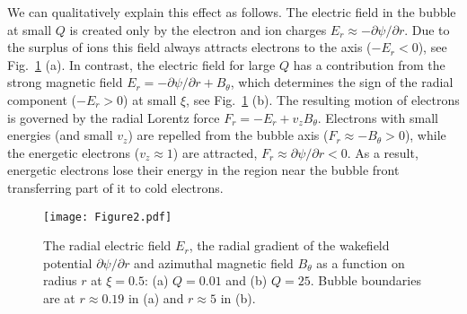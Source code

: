 \documentclass[twocolumn,showpacs,aip]{revtex4}
\begin{document}
We can qualitatively explain  this effect  as follows.  The electric field in the bubble at small $Q$   
 is created only by the electron and ion charges $E_r\approx -\partial \psi/\partial r$. Due to the surplus of ions this field always attracts electrons to the axis ($-E_r<0$), see Fig.~\ref{fig:Electric_field} (a).
In contrast, the electric field  for large $Q$ has  a contribution from  the strong magnetic field $E_r=-\partial \psi/\partial r+B_{\theta}$, which determines the sign of the radial component ($-E_r>0$) at small $\xi$, see Fig.~\ref{fig:Electric_field} (b).    The  resulting motion of electrons is governed  by the radial Lorentz force $F_r=-E_r+v_zB_{\theta}$. %
Electrons with small energies (and small $v_z$) are repelled from the bubble axis ($F_r\approx -B_{\theta}>0$), while the energetic electrons ($v_z\approx 1$) are attracted, $F_r\approx \partial \psi/\partial r<0$. As a result,  energetic electrons lose their energy in the region near the bubble front  transferring part of it to  cold electrons.
\begin{figure}[t]
\centering
	\texttt{[image: Figure2.pdf]}
	\caption{The radial electric field $E_r$, the radial gradient of the wakefield potential $\partial \psi/\partial r$ and azimuthal magnetic field $B_{\theta}$ as a function on radius $r$ at $\xi=0.5$: (a)  $Q=0.01$ and (b)  $Q=25$. Bubble boundaries are at $r\approx 0.19$ in (a) and $r\approx 5$ in (b). }
\label{fig:Electric_field}
\end{figure}






 



 
\end{document}
